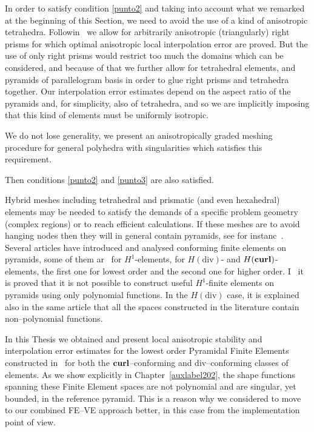 In order to satisfy condition \ref{punto2} and taking into account what we 
remarked at the beginning of this Section, we need to avoid the use of a kind of anisotropic 
tetrahedra. Followin~\cite{MR1866274} we allow for arbitrarily anisotropic (triangularly) 
right prisms for which optimal anisotropic local interpolation error are proved. But the 
use of only right prisms would restrict too much the domains which can be considered, 
and because of that we further allow for tetrahedral elements, and pyramids of parallelogram basis
in order to glue right prisms and tetrahedra together. 
Our interpolation error estimates depend on the aspect ratio of the pyramids 
and, for simplicity, also of tetrahedra, and so we are implicitly imposing 
that this kind of elements must be uniformly isotropic. 

We do not 
lose generality, we present an anisotropically graded meshing procedure
for general polyhedra with singularities which satisfies this requirement.


Then conditions \ref{punto2} and \ref{punto3} are also satisfied.  

Hybrid meshes including tetrahedral and prismatic (and even hexahedral) 
elements may be needed to satisfy the demands of a specific problem geometry 
(complex regions) or to reach efficient calculations. If these meshes are 
to avoid hanging nodes then they will in general contain pyramids, see 
for instanc~\cite{owenSaigal}. Several articles have introduced and analysed 
conforming finite elements on pyramids, some of them ar~\cite{bergot} for $H^1$-elements, 
\cite{gh99, Nigam-2012} for $H(\mbox{div})$- and $H({\bf curl})$-elements, the first one for 
lowest order and the second one for higher order. 
I~\cite{Nigam-2012} it is proved that it is not possible to construct useful $H^1$-finite 
elements on pyramids using only polynomial functions. In the $H(\mbox{div})$ 
case, it is explained also in the same article that all the spaces 
constructed in the literature contain non--polynomial functions.

In this Thesis we obtained and present local anisotropic stability
and interpolation error estimates for the lowest order Pyramidal
Finite Elements constructed in~\cite{gh99, Nigam-2012} for both
the $\textbf{curl}$--conforming and div--conforming classes of elements. As we show
explicitly in Chapter~\ref{auxlabel202}, the shape functions 
spanning these Finite Element spaces are not polynomial and are singular, yet bounded,
in the reference pyramid. This is a reason why we considered to move
to our combined FE--VE approach better, in this case from the implementation
point of view. 


